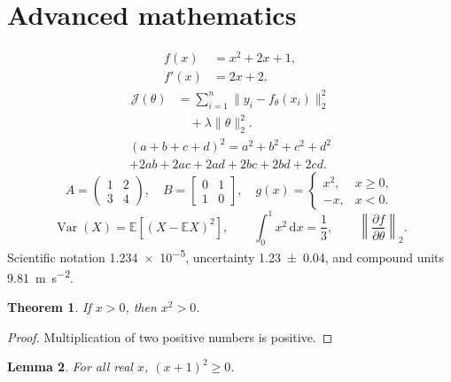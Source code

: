 \documentclass[algorithms,listings]{tempusreport}
\newtheorem{theorem}{Theorem}
\newtheorem{lemma}[theorem]{Lemma}
\begin{document}
\section{Advanced mathematics}
\begin{subequations}\label{eq:system}
\begin{align}
 f(x) &= x^2+2x+1,\label{eq:polynomial}\\
 f'(x)&=2x+2.\label{eq:derivative}
\end{align}
\end{subequations}
\begin{equation}
\begin{split}
\mathcal{J}(\theta)&=\sum_{i=1}^{n}\lVert y_i-f_\theta(x_i)\rVert_2^2\\
&\quad+\lambda\lVert\theta\rVert_2^2.
\end{split}
\end{equation}
\begin{multline}
(a+b+c+d)^2=a^2+b^2+c^2+d^2\\
+2ab+2ac+2ad+2bc+2bd+2cd.
\end{multline}
\[
 A=\begin{pmatrix}1&2\\3&4\end{pmatrix},\quad
 B=\begin{bmatrix}0&1\\1&0\end{bmatrix},\quad
 g(x)=\begin{cases}x^2,&x\geq0,\\-x,&x<0.\end{cases}
\]
\[
\operatorname{Var}(X)=\mathbb{E}[(X-\mathbb{E}X)^2],\qquad
\int_0^1 x^2\,\mathrm{d}x=\frac13,\qquad
\left\lVert\frac{\partial f}{\partial\theta}\right\rVert_2.
\]
Scientific notation \num{1.234e-5}, uncertainty \num{1.23(4)}, and
compound units \qty{9.81}{\metre\per\second\squared}.
\begin{theorem}\label{thm:positive}
If $x>0$, then $x^2>0$.
\end{theorem}
\begin{proof}Multiplication of two positive numbers is positive.\end{proof}
\begin{lemma}For all real $x$, $(x+1)^2\geq0$.\end{lemma}
\end{document}
